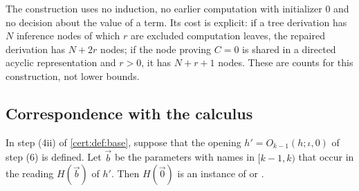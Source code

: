 The construction uses no induction, no earlier computation with initializer
$0$ and no decision about the value of a term. Its cost is explicit: if a
tree derivation has $N$ inference nodes of which $r$ are excluded computation
leaves, the repaired derivation has $N+2r$ nodes; if the node proving $C=0$ is
shared in a directed acyclic representation and $r>0$, it has $N+r+1$ nodes.
These are counts for this construction, not lower bounds.

\subsection{Correspondence with the calculus}

\begin{lemma}\label{cert:lem:zeroinstance}
In step (4ii) of \cref{cert:def:base}, suppose that the opening
$h'=O_{k-1}(h;\iota,0)$ of step (6) is defined. Let $\vec b$ be the parameters
with names in $[k-1,k)$ that occur in the reading $H(\vec b)$ of $h'$. Then
$H(\vec 0)$ is an instance of  or .
\end{lemma}
